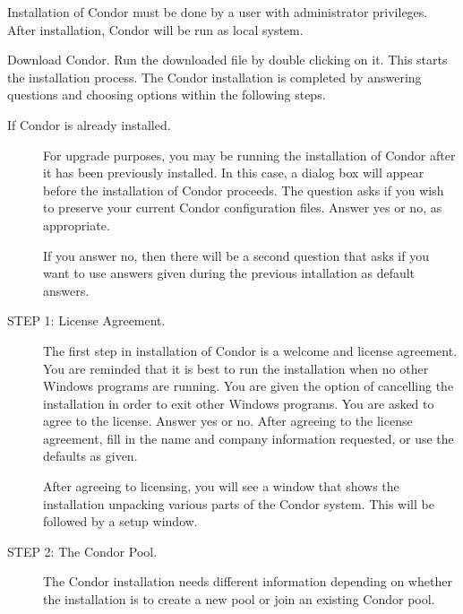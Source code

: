 % 

Installation of Condor must
be done by a user with administrator privileges.
After installation, Condor will be run as local system.

Download Condor.
Run the downloaded file by double clicking on it.
This starts the installation process.
The Condor installation is completed by answering
questions and choosing options within the following steps.


\begin{description}
\item[If Condor is already installed.]

     For upgrade purposes, you may be running the installation of Condor
     after it has been previously installed.
     In this case, a dialog box will appear before the
     installation of Condor proceeds.
     The question asks if you wish to preserve your current
     Condor configuration files.
     Answer yes or no, as appropriate.

     If you answer no, then there will be a second question
     that asks if you want to use answers
     given during the previous intallation
     as default answers.

\item[STEP 1: License Agreement.]

     The first step in installation of Condor
     is a welcome and license agreement.
     You are reminded that it is best to run the installation
     when no other Windows programs are running.
     You are given the option of cancelling the installation
     in order to exit other Windows programs.
     You are asked to agree to the license.
     Answer yes or no.
     After agreeing to the license agreement,
     fill in the name and company information requested,
     or use the defaults as given.

     After agreeing to licensing, you will see a window that
     shows the installation unpacking various parts of the
     Condor system.  This will be followed by a setup window.

\item[STEP 2: The Condor Pool.]

     The Condor installation needs different
     information depending on whether the installation
     is to create a new pool or join an existing
     Condor pool.


\end{description}
